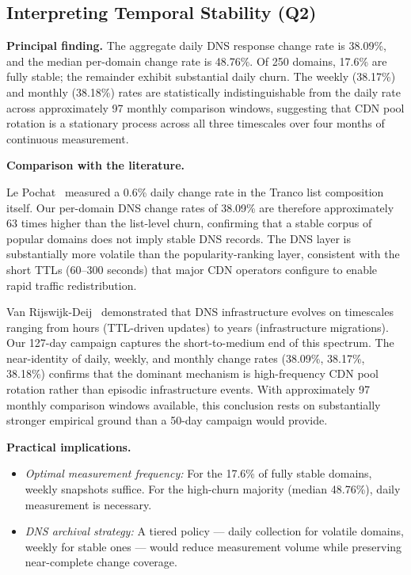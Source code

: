 \bigskip
\subsection{Interpreting Temporal Stability (Q2)}
\label{subsec:5.1.2}

\textbf{Principal finding.} The aggregate daily \ac{DNS} response change rate is 38.09\%, and the median per-domain change rate is 48.76\%. Of 250 domains, 17.6\% are fully stable; the remainder exhibit substantial daily churn. The weekly (38.17\%) and monthly (38.18\%) rates are statistically indistinguishable from the daily rate across approximately 97 monthly comparison windows, suggesting that \ac{CDN} pool rotation is a stationary process across all three timescales over four months of continuous measurement.

\textbf{Comparison with the literature.}

Le Pochat~\cite{LePochat2019} measured a 0.6\% daily change rate in the Tranco list composition itself. Our per-domain \ac{DNS} change rates of 38.09\% are therefore approximately 63 times higher than the list-level churn, confirming that a stable corpus of popular domains does not imply stable \ac{DNS} records. The \ac{DNS} layer is substantially more volatile than the popularity-ranking layer, consistent with the short \ac{TTL}s (60--300 seconds) that major \ac{CDN} operators configure to enable rapid traffic redistribution.

Van Rijswijk-Deij~\cite{vanRijswijk2016} demonstrated that \ac{DNS} infrastructure evolves on timescales ranging from hours (\ac{TTL}-driven updates) to years (infrastructure migrations). Our 127-day campaign captures the short-to-medium end of this spectrum. The near-identity of daily, weekly, and monthly change rates (38.09\%, 38.17\%, 38.18\%) confirms that the dominant mechanism is high-frequency \ac{CDN} pool rotation rather than episodic infrastructure events. With approximately 97 monthly comparison windows available, this conclusion rests on substantially stronger empirical ground than a 50-day campaign would provide.

\textbf{Practical implications.}
\begin{itemize}
  \item \textit{Optimal measurement frequency:} For the 17.6\% of fully stable domains, weekly snapshots suffice. For the high-churn majority (median 48.76\%), daily measurement is necessary.
  \item \textit{\ac{DNS} archival strategy:} A tiered policy --- daily collection for volatile domains, weekly for stable ones --- would reduce measurement volume while preserving near-complete change coverage.
\end{itemize}

